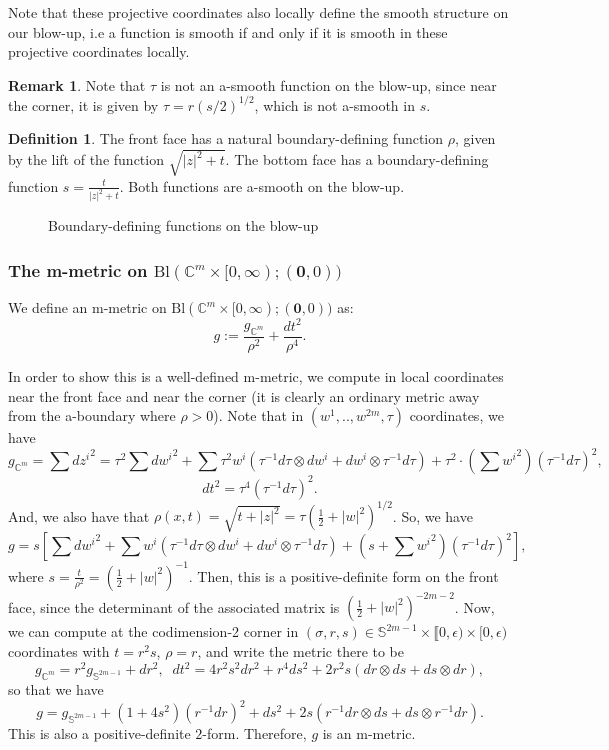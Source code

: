 \documentclass[10pt, a4paper]{article}
\theoremstyle{plain}%
\theoremstyle{definition}
\newtheorem{defn}[theorem]{Definition}
\newtheorem{rem}[theorem]{Remark}
\numberwithin{figure}{section}
\numberwithin{equation}{section}
\newcommand{\bC}{\mathbb{C}}
\newcommand{\bS}{\mathbb{S}}
\newcommand{\Bl}{\mathrm{Bl}(\mathbb{C}^m\times[0,\infty); (\mathbf{0},0))}
\begin{document}
Note that these projective coordinates also locally define the smooth structure on our blow-up, i.e a function is smooth if and only if it is smooth in these projective coordinates locally.
\begin{rem}
    Note that $\tau$ is not an a-smooth function on the blow-up, since near the corner, it is given by $\tau=r (s/2)^{1/2}$, which is not a-smooth in $s$.
\end{rem}

\begin{defn}
	The front face has a natural boundary-defining function $\rho$, given by the lift of the function $\sqrt{|z|^2+t}$. The bottom face has a boundary-defining function $s=\frac{t}{|z|^2+t}$. Both functions are a-smooth on the blow-up.
\end{defn}

\begin{figure}[!htb]
	\centering
	\fontsize{9}{9}\selectfont{}
	
	\caption{Boundary-defining functions on the blow-up}
\end{figure}

\subsubsection{The m-metric on $\Bl$}
We define an m-metric on $\Bl$ as:
\[
g:= \frac{g_{\bC^m}}{\rho^2}+\frac{dt^2}{\rho^4}.
\]

In order to show this is a well-defined m-metric, we compute in local coordinates near the front face and near the corner (it is clearly an ordinary metric away from the a-boundary where $\rho >0$). Note that in $(w^1,..,w^{2m},\tau)$ coordinates, we have \[
g_{\mathbb{C}^m} = \sum {dz^i} ^2 = \tau^2 \sum {dw^i}^2 + \sum \tau^2 w^i(\tau^{-1}d\tau \otimes dw^i+dw^i\otimes \tau^{-1}d\tau)+ \tau^2\cdot\left(\sum {w^i}^2\right)(\tau^{-1}d\tau)^2,
\]
\[
dt^2 = \tau^4(\tau^{-1}d\tau)^2.
\]
And, we also have that $\rho(x,t) = \sqrt{t+|z|^2} = \tau (\frac{1}{2} + |w|^2)^{1/2}$. So, we have \[
g = s \left[ \sum {dw^i}^2 + \sum  w^i(\tau^{-1}d\tau \otimes dw^i+dw^i\otimes \tau^{-1}d\tau)+ \left(s+\sum {w^i}^2\right)(\tau^{-1}d\tau)^2\right],
\]
where $s= \frac{t}{\rho^2}=(\frac{1}{2}+|w|^2)^{-1}$.
Then, this is a positive-definite form on the front face, since the determinant of the associated matrix is $(\frac{1}{2}+|w|^2)^{-2m-2}$. Now, we can compute at the codimension-2 corner in $(\sigma,r,s)\in \bS^{2m-1}\times\llbracket 0 ,\epsilon)\times [0,\epsilon)$ coordinates with $t=r^2s$, $\rho=r$, and write the metric there to be\[
g_{\bC^m}=r^2g_{\bS^{2m-1}}+dr^2,\; \; dt^2= 4r^2s^2dr^2 + r^4ds^2+2r^2s(dr\otimes ds+ds\otimes dr),
\]
so that we have \[
g= g_{\bS^{2m-1} } + (1+4s^2)(r^{-1}dr)^2+ds^2+2s(r^{-1}dr\otimes ds + ds\otimes r^{-1}dr).
\]
This is also a positive-definite $2$-form. Therefore, $g$ is an m-metric.
\end{document}
